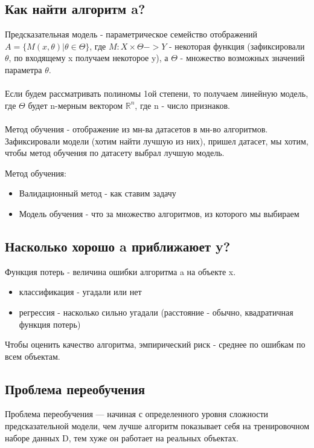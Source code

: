 \documentclass{amsart}
\begin{document}
\subsection{Как найти алгоритм a?}
\hfill \newline
Предсказательная модель - параметрическое семейство отображений $A = \{M(x, \theta)| \theta \in \Theta\}$, где $M: X \times \Theta -> Y$ - некоторая функция (зафиксировали $\theta$, по входящему x получаем некоторое y), а $\Theta$ - множество возможных значений параметра $\theta$.\\ \\ 
Если будем рассматривать полиномы 1ой степени, то получаем линейную модель, где $\Theta$ будет n-мерным вектором $\mathbb{R}^{n}$, где n - число признаков.\\ \\
Метод обучения - отображение из мн-ва датасетов в мн-во алгоритмов.
Зафиксировали модели (хотим найти лучшую из них), пришел датасет, мы хотим, чтобы метод обучения по датасету выбрал лучшую модель.

Метод обучения:
\begin{itemize}
    \item Валидационный метод - как ставим задачу
    \item Модель обучения - что за множество алгоритмов, из которого мы выбираем
\end{itemize}

\subsection{Насколько хорошо a приближаюет y?}
\hfill \newline
Функция потерь - величина ошибки алгоритма a на объекте x.
\begin{itemize}
    \item классификация - угадали или нет 
    \item регрессия - насколько сильно угадали (расстояние - обычно, квадратичная функция потерь)
\end{itemize}

Чтобы оценить качество алгоритма, эмпирический риск - среднее по ошибкам по всем объектам.

\subsection{Проблема переобучения}
\hfill \newline
Проблема переобучения — начиная с определенного уровня сложности предсказательной модели, чем лучше алгоритм показывает себя на тренировочном наборе данных D, тем хуже он работает на реальных объектах.
\end{document}
